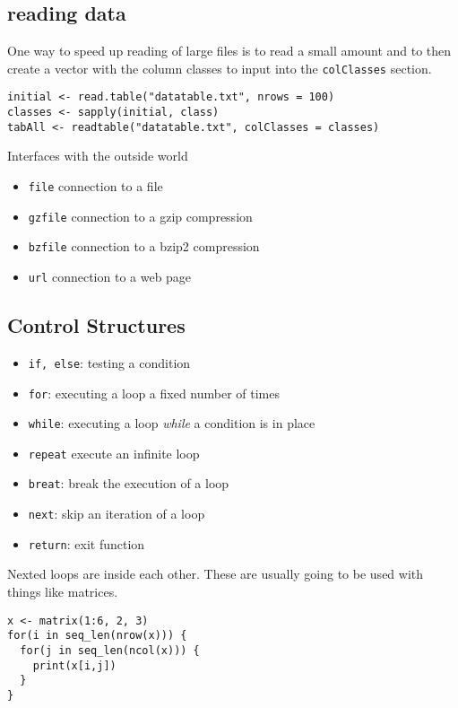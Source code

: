 \documentclass[12pt, a4paper, oneside]{article}\usepackage[]{graphicx}\usepackage[]{color}
\begin{document}
\subsection{reading data}
One way to speed up reading of large files is to read a small amount and to then create a vector with the column classes to input into the \lstinline{colClasses} section. 

\begin{lstlisting}
initial <- read.table("datatable.txt", nrows = 100)
classes <- sapply(initial, class)
tabAll <- readtable("datatable.txt", colClasses = classes)
\end{lstlisting}

Interfaces with the outside world
\begin{itemize}
\item \lstinline{file} connection to a file
\item \lstinline{gzfile} connection to a gzip compression
\item \lstinline{bzfile} connection to a bzip2 compression
\item \lstinline{url} connection to a web page
\end{itemize}

\subsection{Control Structures}
\begin{itemize}
\item \lstinline{if, else}: testing a condition
\item \lstinline{for}: executing a loop a fixed number of times
\item \lstinline{while}: executing a loop \emph{while} a condition is in place
\item \lstinline{repeat} execute an infinite loop
\item \lstinline{breat}: break the execution of a loop
\item \lstinline{next}: skip an iteration of a loop
\item \lstinline{return}: exit function
\end{itemize}

Nexted loops are inside each other. These are usually going to be used with things like matrices. 

\begin{lstlisting}
x <- matrix(1:6, 2, 3)
for(i in seq_len(nrow(x))) {
  for(j in seq_len(ncol(x))) {
    print(x[i,j])
  }
}
\end{lstlisting}
\end{document}
